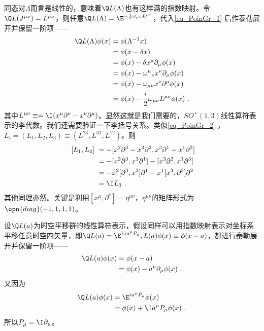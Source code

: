 同态对$\Lambda$而言是线性的，意味着$\Q L(\Lambda)$也有这样满的指数映射。令$\Q L(J^{\mu \nu})=L^{\mu \nu}$，则任意$\Q L(\Lambda)=\E^{-\frac{i}{2} \omega_{\mu \nu} L^{\mu \nu}}$，代入\autoref{eq_PoinGr_1} 后作泰勒展开并保留一阶项——
\begin{equation}
\begin{aligned}
\Q L(\Lambda)\phi(x)&=\phi(\Lambda^{-1}x)\\
&=\phi(x-\delta x)\\
&= \phi(x)-\delta x^{\mu} \partial_{\mu} \phi(x) \\
&= \phi(x)-\omega^{\mu}{ }_{\nu} x^{\nu} \partial_{\mu} \phi(x) \\
&=\phi(x)-\omega_{\mu \nu} x^{\nu} \partial^{\mu} \phi(x) \\
&= \phi(x)-\frac{i}{2} \omega_{\mu \nu} L^{\mu \nu} \phi(x)~.
\end{aligned}
\end{equation}
其中$L^{\mu\nu}\equiv=\I(x^{\mu}\partial^{\nu}-x^{\nu}\partial^{\mu})$。显然这就是我们需要的，$SO^+(1,3)$线性算符表示的李代数。我们还需要验证一下李括号关系。类似\autoref{eq_PoinGr_2}  ，$L_i=(L_1,L_2,L_3)\equiv(L^{23},L^{31},L^{12})$。则
\begin{equation}
\begin{aligned}
~[L_1,L_2]~&=-[x^{2}\partial^{3}-x^{3}\partial^{2},x^{3}\partial^{1}-x^{1}\partial^{3}]\\
&=-[x^2\partial^3,x^3\partial^1]-[x^3\partial^2,x^1\partial^3]\\
&=-x^2[\partial^3,x^3]\partial^1-x^1[x^3,\partial^3]\partial^2\\
&=\I L_3~.
\end{aligned}
\end{equation}
其他同理亦然。关键是利用$[x^{\mu},\partial^{\nu}]=\eta^{\mu\nu}$，$\eta^{\mu\nu}$的矩阵形式为$\opn{diag}(-1,1,1,1)$。

设$\Q L(a)$为时空平移群的线性算符表示，假设同样可以用指数映射表示对坐标系平移任意时空四矢量，即$\Q L(a)=\E^{\I a^{\mu}P_{\mu}},L(a)\phi(x)\equiv \phi(x-a)$，都进行泰勒展开并保留一阶项——
\begin{equation}\begin{aligned}
\Q L(a)\phi(x)& =\phi(x-a) \\
&=\phi(x)-a^{\mu}\partial_{\mu}\phi(x)~.
\end{aligned}\end{equation}
又因为
\begin{equation}
\begin{aligned}
\Q L(a)\phi(x)& = \E^{ia^{\mu}P_{\mu}}\phi(x) \\
&=\phi(x)+\I a^{\mu}P_{\mu}\phi(x)~.
\end{aligned}
\end{equation}
所以$P_{\mu}=\I\partial_{\mu}$。

